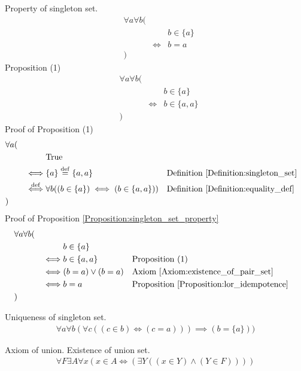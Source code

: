 \begin{prop}
\label{Proposition:singleton_set_property}
Property of singleton set.
\begin{align*}
& \forall a \forall b ( \\
& & & b \in \{ a \} \\
& & \iff & b = a \\
& )
\end{align*}
Proposition (1)
\begin{align*}
& \forall a \forall b ( \\
& & & b \in \{ a \} \\
& & \iff & b \in \{ a , a \} \\
& )
\end{align*}
Proof of Proposition (1)
\begin{align*}
& \forall a ( \\
& & & \text{True} \\
& & \iff & \{ a \} \overset{\operatorname{def}}{=} \{ a , a \}
& & \text{Definition \ref{Definition:singleton_set}} \\
& & \overset{\operatorname{def}}{\iff} & \forall b ((b \in \{ a \}) \iff (b \in \{ a , a \}))
& & \text{Definition \ref{Definition:equality_def}} \\
& )
\end{align*}
Proof of Proposition \ref{Proposition:singleton_set_property}
\begin{align*}
& \forall a \forall b ( \\
& & & b \in \{ a \} \\
& & \iff & b \in \{ a , a \}
& & \text{Proposition (1)} \\
& & \iff & (b = a) \lor (b = a)
& & \text{Axiom \ref{Axiom:existence_of_pair_set}} \\
& & \iff & b = a
& & \text{Proposition \ref{Proposition:lor_idempotence}} \\
& )
\end{align*}
\end{prop}

\begin{prop}
\label{Proposition:uniqueness_of_singleton_set}
Uniqueness of singleton set.
\begin{align*}
\forall a \forall b (\forall c ((c \in b) \iff (c = a))) \implies (b = \{ a \}))
\end{align*}
\end{prop}

\begin{axm}
\label{Axiom:axiom_of_union}
Axiom of union. Existence of union set.
\begin{align*}
\forall F \exists A \forall x (x \in A \iff (\exists Y ((x \in Y) \land (Y \in F))))
\end{align*}
\end{axm}


